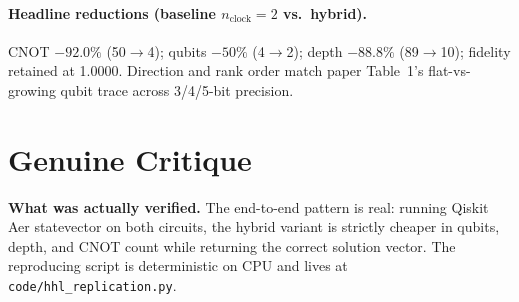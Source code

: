 \documentclass[11pt]{article}
\begin{document}
\paragraph{Headline reductions (baseline $n_\mathrm{clock}=2$ vs.\ hybrid).}
CNOT $-92.0\%$ (50$\to$4); qubits $-50\%$ (4$\to$2); depth $-88.8\%$
(89$\to$10); fidelity retained at 1.0000. Direction and rank order match
paper Table~1's flat-vs-growing qubit trace across 3/4/5-bit precision.

\section{Genuine Critique}
\textbf{What was actually verified.} The end-to-end pattern is real:
running Qiskit Aer statevector on both circuits, the hybrid variant is
strictly cheaper in qubits, depth, and CNOT count while returning the
correct solution vector. The reproducing script is deterministic on CPU
and lives at \texttt{code/hhl\_replication.py}.
\end{document}
